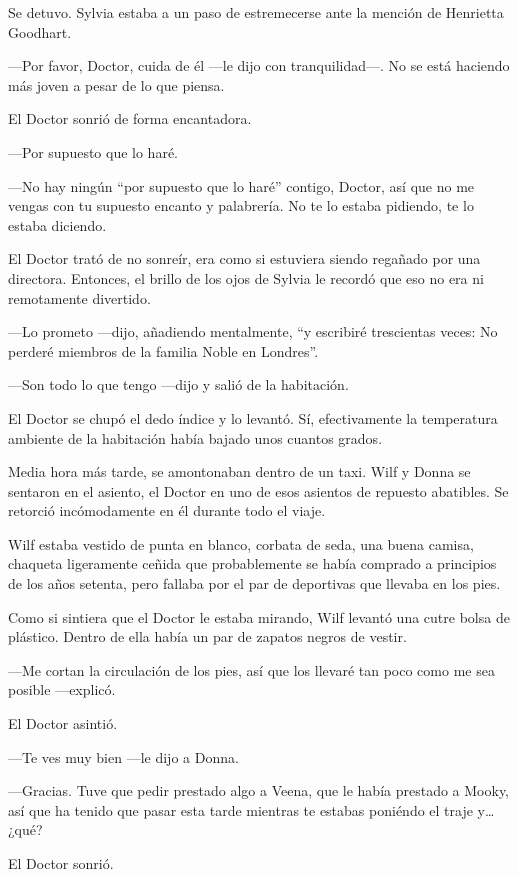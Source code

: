 Se detuvo. Sylvia estaba a un paso de estremecerse ante la mención de
Henrietta Goodhart.

---Por favor, Doctor, cuida de él ---le dijo con tranquilidad---. No se
está haciendo más joven a pesar de lo que piensa.

El Doctor sonrió de forma encantadora.

---Por supuesto que lo haré.

---No hay ningún ``por supuesto que lo haré'' contigo, Doctor, así que
no me vengas con tu supuesto encanto y palabrería. No te lo estaba
pidiendo, te lo estaba diciendo.

El Doctor trató de no sonreír, era como si estuviera siendo regañado por
una directora. Entonces, el brillo de los ojos de Sylvia le recordó que
eso no era ni remotamente divertido.

---Lo prometo ---dijo, añadiendo mentalmente, ``y escribiré trescientas
veces: No perderé miembros de la familia Noble en Londres''.

---Son todo lo que tengo ---dijo y salió de la habitación.

El Doctor se chupó el dedo índice y lo levantó. Sí, efectivamente la
temperatura ambiente de la habitación había bajado unos cuantos grados.

Media hora más tarde, se amontonaban dentro de un taxi. Wilf y Donna se
sentaron en el asiento, el Doctor en uno de esos asientos de repuesto
abatibles. Se retorció incómodamente en él durante todo el viaje.

Wilf estaba vestido de punta en blanco, corbata de seda, una buena
camisa, chaqueta ligeramente ceñida que probablemente se había comprado
a principios de los años setenta, pero fallaba por el par de deportivas
que llevaba en los pies.

Como si sintiera que el Doctor le estaba mirando, Wilf levantó una cutre
bolsa de plástico. Dentro de ella había un par de zapatos negros de
vestir.

---Me cortan la circulación de los pies, así que los llevaré tan poco
como me sea posible ---explicó.

El Doctor asintió.

---Te ves muy bien ---le dijo a Donna.

---Gracias. Tuve que pedir prestado algo a Veena, que le había prestado
a Mooky, así que ha tenido que pasar esta tarde mientras te estabas
poniéndo el traje y\ldots{} ¿qué?

El Doctor sonrió.

